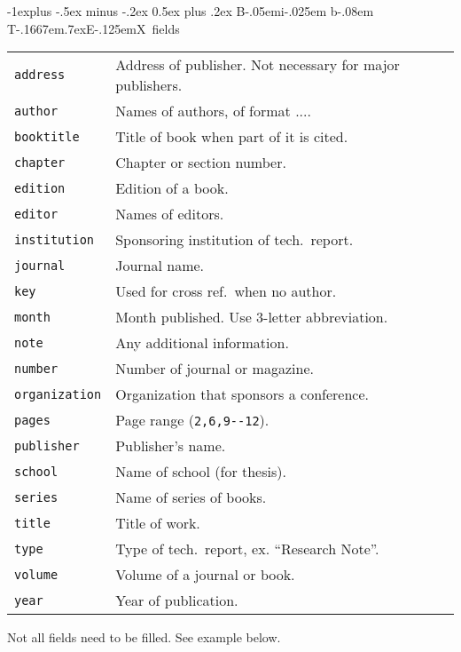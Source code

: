 \documentclass[10pt,landscape]{article}
\makeatletter
\renewcommand{\subsection}{\@startsection{subsection}{2}{0mm}%
                                {-1explus -.5ex minus -.2ex}%
                                {0.5ex plus .2ex}%
                                {\normalfont\normalsize\bfseries}}
\def\BibTeX{{\rm B\kern-.05em{\sc i\kern-.025em b}\kern-.08em
    T\kern-.1667em\lower.7ex\hbox{E}\kern-.125emX}}
\makeatother
\begin{document}
\begin{multicols}{3}
\subsection{\BibTeX\ fields}
\begin{tabular}{@{}p{\the\MyLen}@{}p{\linewidth-\the\MyLen}@{}}
\verb!address!         &  Address of publisher.  Not necessary for major
                                publishers.  \\
\verb!author!           &  Names of authors, of format .... \\
\verb!booktitle!        &  Title of book when part of it is cited. \\
\verb!chapter!          &  Chapter or section number. \\
\verb!edition!          &  Edition of a book. \\
\verb!editor!           &  Names of editors. \\
\verb!institution!      &  Sponsoring institution of tech.\ report. \\
\verb!journal!          &  Journal name. \\
\verb!key!              &  Used for cross ref.\ when no author. \\
\verb!month!            &  Month published. Use 3-letter abbreviation. \\
\verb!note!             &  Any additional information. \\
\verb!number!           &  Number of journal or magazine. \\
\verb!organization!     &  Organization that sponsors a conference. \\
\verb!pages!            &  Page range (\verb!2,6,9--12!). \\
\verb!publisher!        &  Publisher's name. \\
\verb!school!           &  Name of school (for thesis). \\
\verb!series!           &  Name of series of books. \\
\verb!title!            &  Title of work. \\
\verb!type!             &  Type of tech.\ report, ex. ``Research Note''. \\
\verb!volume!           &  Volume of a journal or book. \\
\verb!year!             &  Year of publication. \\
\end{tabular}
Not all fields need to be filled.  See example below.


\end{multicols}
\end{document}
